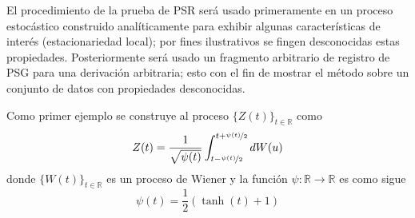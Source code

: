 \documentclass[12pt,letterpaper]{book}
\newcommand{\R}{\mathbb{R}}
\begin{document}
%

El procedimiento de la prueba de PSR será usado primeramente en un proceso estocástico construido analíticamente para exhibir algunas características de interés (estacionariedad local); por fines ilustrativos se fingen desconocidas estas propiedades.
Posteriormente será usado un fragmento arbitrario de registro de PSG para una derivación arbitraria; esto con el fin de mostrar el método sobre un conjunto de datos con propiedades desconocidas.


Como primer ejemplo se construye al proceso $\{Z(t)\}_{t\in\R}$ como
\begin{equation}
Z(t) = \frac{1}{\sqrt{\psi(t)}} \int_{t-\nicefrac{\psi(t)}{2}}^{t+\nicefrac{\psi(t)}{2}} dW(u) 
\label{lazy20}
\end{equation}
donde $\{W(t)\}_{t\in\R}$ es un proceso de Wiener y 
%
la función $\psi:\R\rightarrow\R$ es como sigue
\begin{equation}
\psi(t) = \frac{1}{2} \left( \tanh(t) + 1 \right)
\end{equation}

\end{document}
